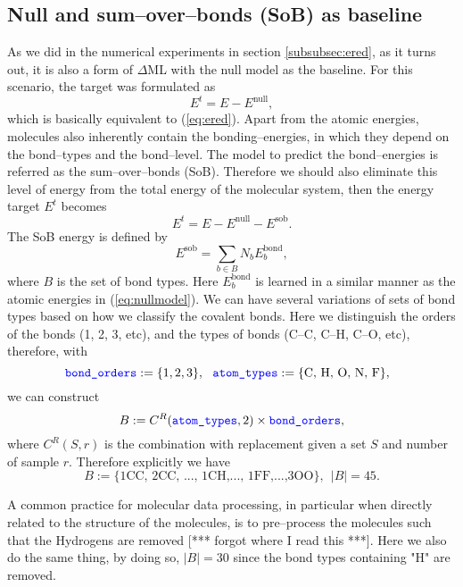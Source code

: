 \documentclass[12pt]{article}
\def\att{                    %
        \marginpar[ \hspace*{\fill} \raisebox{-0.2em}{\rule{2mm}{1.2em}} ]
        {\raisebox{-0.2em}{\rule{2mm}{1.2em}} }
        }
\def\at#1{[*** \att #1 ***]}  %
\begin{document}
\subsection{Null and sum--over--bonds (SoB) as baseline}
As we did in the numerical experiments in section \ref{subsubsec:ered}, as it turns out, it is also a form of $\Delta$ML with the null model as the baseline. For this scenario, the target was formulated as
\begin{equation}
    E^t = E - E^\text{null},
\end{equation}
which is basically equivalent to (\ref{eq:ered}).
Apart from the atomic energies, molecules also inherently contain the bonding--energies, in which they depend on the bond--types and the bond--level. The model to predict the bond--energies is referred as the sum--over--bonds (SoB). Therefore we should also eliminate this level of energy from the total energy of the molecular system, then the energy target $E^t$ becomes
\begin{equation}
    E^t = E - E^\text{null} - E^\text{sob}.
    \label{eq:null_sob_base}
\end{equation}
The SoB energy is defined by
\begin{equation}
    E^\text{sob} = \sum_{b\in B} N_b E^\text{bond}_b, 
    \label{eq:sobmodel}
\end{equation}
where $B$ is the set of bond types. Here $E^\text{bond}_b$ is learned in a similar manner as the atomic energies in (\ref{eq:nullmodel}). We can have several variations of sets of bond types based on how we classify the covalent bonds. Here we distinguish the orders of the bonds (1, 2, 3, etc), and the types of bonds (C--C, C--H, C--O, etc), therefore, with
\begin{equation*}
        \codeword{bond_orders} := \{1, 2, 3\}, ~~ 
        \codeword{atom_types} := \{\text{C, H, O, N, F}\}, ~~
\end{equation*}
we can construct
\begin{equation*}
    B := C^R(\codeword{atom_types}, 2) \times \codeword{bond_orders}, 
\end{equation*}
where $C^R(S, r)$ is the combination with replacement given a set $S$ and number of sample $r$. Therefore explicitly we have
\begin{equation*}
    B := \{\text{1CC, 2CC, ..., 1CH,..., 1FF,...,3OO}\}, ~~ |B| = 45.
\end{equation*}

A common practice for molecular data processing, in particular when directly related to the structure of the molecules, is to pre--process the molecules such that the Hydrogens are removed \at{forgot where I read this}. 
Here we also do the same thing, by doing so, $|B| = 30$ since the bond types containing "H" are removed.
\end{document}
